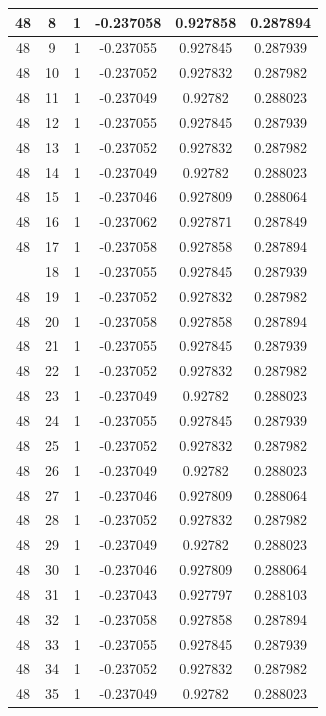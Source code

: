\documentclass[12pt,a4paper]{article}
\numberwithin{equation}{section}
\numberwithin{figure}{section}
\numberwithin{table}{section}
\begin{document}
\begin{longtable}{|c|c|c|c|c|c|}
48 & 8 & 1 & -0.237058 & 0.927858 & 0.287894 \\ \hline
48 & 9 & 1 & -0.237055 & 0.927845 & 0.287939 \\ \hline
48 & 10 & 1 & -0.237052 & 0.927832 & 0.287982 \\ \hline
48 & 11 & 1 & -0.237049 & 0.92782 & 0.288023 \\ \hline
48 & 12 & 1 & -0.237055 & 0.927845 & 0.287939 \\ \hline
48 & 13 & 1 & -0.237052 & 0.927832 & 0.287982 \\ \hline
48 & 14 & 1 & -0.237049 & 0.92782 & 0.288023 \\ \hline
48 & 15 & 1 & -0.237046 & 0.927809 & 0.288064 \\ \hline
48 & 16 & 1 & -0.237062 & 0.927871 & 0.287849 \\ \hline
48 & 17 & 1 & -0.237058 & 0.927858 & 0.287894 \\ \hline
\pagebreak
48 & 18 & 1 & -0.237055 & 0.927845 & 0.287939 \\ \hline
48 & 19 & 1 & -0.237052 & 0.927832 & 0.287982 \\ \hline
48 & 20 & 1 & -0.237058 & 0.927858 & 0.287894 \\ \hline
48 & 21 & 1 & -0.237055 & 0.927845 & 0.287939 \\ \hline
48 & 22 & 1 & -0.237052 & 0.927832 & 0.287982 \\ \hline
48 & 23 & 1 & -0.237049 & 0.92782 & 0.288023 \\ \hline
48 & 24 & 1 & -0.237055 & 0.927845 & 0.287939 \\ \hline
48 & 25 & 1 & -0.237052 & 0.927832 & 0.287982 \\ \hline
48 & 26 & 1 & -0.237049 & 0.92782 & 0.288023 \\ \hline
48 & 27 & 1 & -0.237046 & 0.927809 & 0.288064 \\ \hline
48 & 28 & 1 & -0.237052 & 0.927832 & 0.287982 \\ \hline
48 & 29 & 1 & -0.237049 & 0.92782 & 0.288023 \\ \hline
48 & 30 & 1 & -0.237046 & 0.927809 & 0.288064 \\ \hline
48 & 31 & 1 & -0.237043 & 0.927797 & 0.288103 \\ \hline
48 & 32 & 1 & -0.237058 & 0.927858 & 0.287894 \\ \hline
48 & 33 & 1 & -0.237055 & 0.927845 & 0.287939 \\ \hline
48 & 34 & 1 & -0.237052 & 0.927832 & 0.287982 \\ \hline
48 & 35 & 1 & -0.237049 & 0.92782 & 0.288023 \\ \hline

\end{longtable}
\end{document}

